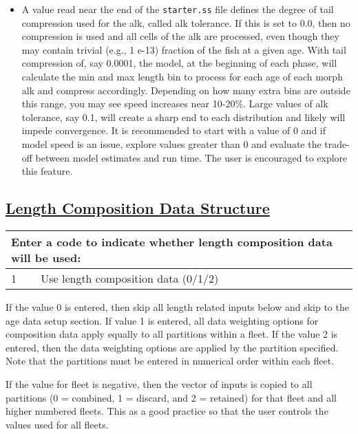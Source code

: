 \begin{itemize}
	\item A value read near the end of the \texttt{starter.ss} file defines the degree of tail compression used for the \gls{alk}, called \gls{alk} tolerance. If this is set to 0.0, then no compression is used and all cells of the \gls{alk} are processed, even though they may contain trivial (e.g., 1 e-13) fraction of the fish at a given age. With tail compression of, say 0.0001, the model, at the beginning of each phase, will calculate the min and max length bin to process for each age of each morph \gls{alk} and compress accordingly. Depending on how many extra bins are outside this range, you may see speed increases near 10-20\%. Large values of \gls{alk} tolerance, say 0.1, will create a sharp end to each distribution and likely will impede convergence. It is recommended to start with a value of 0 and if model speed is an issue, explore values greater than 0 and evaluate the trade-off between model estimates and run time. The user is encouraged to explore this feature.
\end{itemize}

\hypertarget{length-comp-structure}{}
\subsection[Length Composition Data Structure]{\protect\hyperlink{length-comp-structure}{Length Composition Data Structure}}
\begin{tabular}{p{2cm} p{13cm}}
		\multicolumn{2}{l}{Enter a code to indicate whether length composition data will be used:} \Tstrut\Bstrut\\
		\hline	
		1 & Use length composition data (0/1/2) \Tstrut\Bstrut\\
		\hline									  
\end{tabular}
\leavevmode\tagmcend\tagstructend\par

If the value 0 is entered, then skip all length related inputs below and skip to the age data setup section. If value 1 is entered, all data weighting options for composition data apply equally to all partitions within a fleet. If the value 2 is entered, then the data weighting options are applied by the partition specified. Note that the partitions must be entered in numerical order within each fleet.

If the value for fleet is negative, then the vector of inputs is copied to all partitions (0 = combined, 1 = discard, and 2 = retained) for that fleet and all higher numbered fleets. This as a good practice so that the user controls the values used for all fleets.

